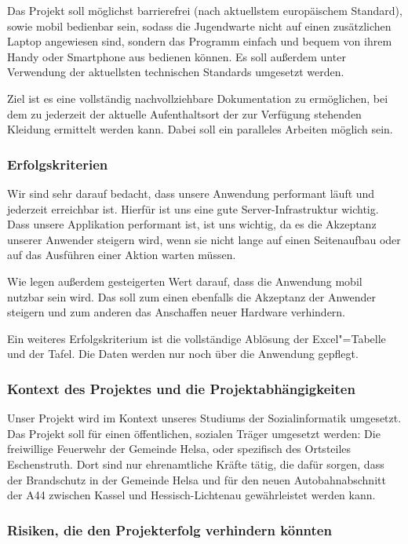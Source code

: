Das Projekt soll möglichst barrierefrei (nach aktuellstem europäischem Standard), sowie mobil bedienbar sein, sodass die Jugendwarte nicht auf einen zusätzlichen Laptop angewiesen sind, sondern das Programm einfach und bequem von ihrem Handy oder Smartphone aus bedienen können. Es soll außerdem unter Verwendung der aktuellsten technischen Standards umgesetzt werden.

Ziel ist es eine vollständig nachvollziehbare Dokumentation zu ermöglichen, bei dem zu jederzeit der aktuelle Aufenthaltsort der zur Verfügung stehenden Kleidung ermittelt werden kann. Dabei soll ein paralleles Arbeiten möglich sein. 

\subsubsection{Erfolgskriterien}

Wir sind sehr darauf bedacht, dass unsere Anwendung performant läuft und jederzeit erreichbar ist. Hierfür ist uns eine gute Server-Infrastruktur wichtig. Dass unsere Applikation performant ist, ist uns wichtig, da es die Akzeptanz unserer Anwender steigern wird, wenn sie nicht lange auf einen Seitenaufbau oder auf das Ausführen einer Aktion warten müssen. 

Wie legen außerdem gesteigerten Wert darauf, dass die Anwendung mobil nutzbar sein wird. Das soll zum einen ebenfalls die Akzeptanz der Anwender steigern und zum anderen das Anschaffen neuer Hardware verhindern.

Ein weiteres Erfolgskriterium ist die vollständige Ablösung der Excel"=Tabelle und der Tafel. Die Daten werden nur noch über die Anwendung gepflegt.


\subsubsection{Kontext des Projektes und die Projektabhängigkeiten}

Unser Projekt wird im Kontext unseres Studiums der Sozialinformatik umgesetzt. 
Das Projekt soll für einen öffentlichen, sozialen Träger umgesetzt werden: Die freiwillige Feuerwehr der Gemeinde Helsa, oder spezifisch des Ortsteiles Eschenstruth. Dort sind nur ehrenamtliche Kräfte tätig, die dafür sorgen, dass der Brandschutz in der Gemeinde Helsa und für den neuen Autobahnabschnitt der A44 zwischen Kassel und Hessisch-Lichtenau gewährleistet werden kann. 

\subsubsection{Risiken, die den Projekterfolg verhindern könnten}

